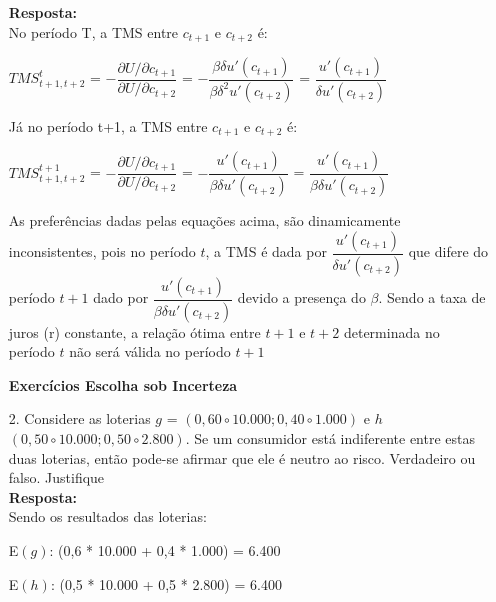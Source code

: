 \begin{enumerate}
\textbf{Resposta:}\\

No período T, a TMS entre {$ c_{t+1}$} e {$ c_{t+2}$} é:\\

\begin{center}
{$ \displaystyle TMS^{t}_ {{t+1},{t+2}}$} = {$ - \dfrac{\partial U/\partial c_{t+1}}{\partial U/\partial c_{t+2}}$} = {$ - \dfrac{\beta \delta u' (c_{t+1})}{\beta \delta^{2} u' (c_{t+2})}$} = {$\dfrac{ u'(c_{t+1})}{\delta u'(c_{t+2})}$}
\end{center}

Já no período t+1, a TMS entre {$ c_{t+1}$} e {$ c_{t+2}$} é:\\

\begin{center}
{$ \displaystyle TMS^{t+1}_ {{t+1},{t+2}}$} = {$ - \dfrac{\partial U/\partial c_{t+1}}{\partial U/\partial c_{t+2}}$} = {$ - \dfrac{u' (c_{t+1})}{\beta \delta u' (c_{t+2})}$} = {$\dfrac{ u'(c_{t+1})}{\beta \delta u'(c_{t+2})}$}
\end{center}

As preferências dadas pelas equações acima, são dinamicamente inconsistentes, pois no período {$t$}, a TMS é dada por {$\dfrac{ u'(c_{t+1})}{\delta u'(c_{t+2})}$} que difere do período {$t+1$} dado por {$\dfrac{ u'(c_{t+1})}{\beta \delta u'(c_{t+2})}$} devido a presença do {$\beta$}. Sendo a taxa de juros (r) constante, a relação ótima entre {$t+1$} e {$t+2$} determinada no período {$t$} não será válida no período {$t+1$}

\newpage

\begin{center}
\textbf{Exercícios Escolha sob Incerteza}\\
\end{center}

\item[2.] Considere as loterias {$g$} = {$(0,60 \circ 10.000; 0,40 \circ 1.000)$} e {$h$} {$(0,50 \circ 10.000; 0,50 \circ 2.800)$}. Se um consumidor está indiferente entre estas duas loterias, então pode-se afirmar que ele é neutro ao risco. Verdadeiro ou falso. Justifique \\

\textbf{Resposta:}\\

Sendo os resultados das loterias:

E{$(g)$}: (0,6 * 10.000 + 0,4 * 1.000) = 6.400\

E{$(h)$}: (0,5 * 10.000 + 0,5 * 2.800) = 6.400\\


\end{enumerate}

